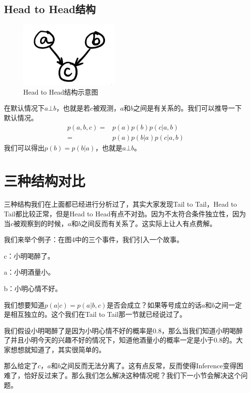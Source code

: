 \documentclass[a4paper]{article}
\begin{document}
\subsection{Head to Head结构}
\begin{figure}[H]
    \centering
    \includegraphics[width=.35\textwidth]{微信图片_20191124104553.png}
    \caption{Head to Head结构示意图}
    \label{fig:my_label_1}
\end{figure}
在默认情况下$a\bot b$，也就是若$c$被观测，$a$和$b$之间是有关系的。我们可以推导一下默认情况。
\begin{equation}
    \begin{split}
        p(a,b,c) = & p(a)p(b)p(c|a,b) \\
        = & p(a)p(b|a)p(c|a,b)
    \end{split}
\end{equation}
我们可以得出$p(b)=p(b|a)$，也就是$a\bot b$。

\section{三种结构对比}
三种结构我们在上面都已经进行分析过了，其实大家发现Tail to Tail，Head to Tail都比较正常，但是Head to Head有点不对劲。因为不太符合条件独立性，因为当$c$被观察到的时候，$a$和$b$之间反而有关系了。这实际上让人有点费解。

我们来举个例子：在图4中的三个事件，我们引入一个故事。

c：小明喝醉了。

a：小明酒量小。

b：小明心情不好。

我们想要知道$p(a|c)=p(a|b,c)$是否会成立？如果等号成立的话$a$和$b$之间一定是相互独立的。这个我们在Tail to Tail那一节就已经说过了。

我们假设小明喝醉了是因为小明心情不好的概率是0.8，那么当我们知道小明喝醉了并且小明今天的兴趣不好的情况下，知道他酒量小的概率一定是小于0.8的。大家想想就知道了，其实很简单的。

那么给定了$c$，$a$和$b$之间反而无法分离了。这有点反常，反而使得Inference变得困难了，恰好反过来了。那么我们怎么解决这种情况呢？我们下一小节会解决这个问题。
\end{document}

